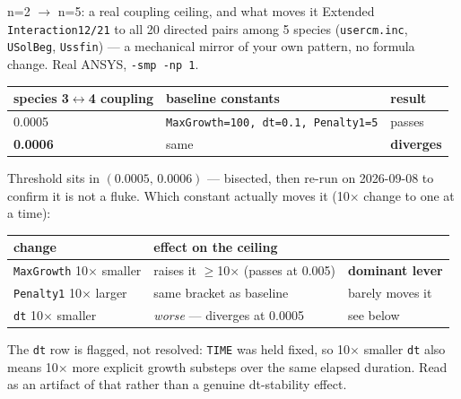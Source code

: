 \documentclass[aspectratio=169,11pt]{beamer}
\begin{document}
\begin{frame}{n=2 $\to$ n=5: a real coupling ceiling, and what moves it}
\small Extended \texttt{Interaction12/21} to all 20 directed pairs among 5
species (\texttt{usercm.inc}, \texttt{USolBeg}, \texttt{Ussfin}) --- a
mechanical mirror of your own pattern, no formula change. Real ANSYS,
\texttt{-smp -np 1}.
\vspace{3pt}
\begin{center}\footnotesize
\begin{tabular}{@{}lll@{}}
\toprule
species 3$\leftrightarrow$4 coupling & baseline constants & result \\
\midrule
0.0005 & \texttt{MaxGrowth=100, dt=0.1, Penalty1=5} & passes \\
\textbf{0.0006} & same & \textbf{diverges} \\
\bottomrule
\end{tabular}
\end{center}
\vspace{2pt}
{\footnotesize Threshold sits in $(0.0005,\,0.0006)$ --- bisected, then
re-run on 2026-09-08 to confirm it is not a fluke.}
\vspace{5pt}
\small Which constant actually moves it (10$\times$ change to one at a time):
\begin{center}\footnotesize
\begin{tabular}{@{}lll@{}}
\toprule
change & effect on the ceiling & \\
\midrule
\texttt{MaxGrowth} 10$\times$ smaller & raises it $\geq$10$\times$ (passes at 0.005) & \textbf{dominant lever} \\
\texttt{Penalty1} 10$\times$ larger & same bracket as baseline & barely moves it \\
\texttt{dt} 10$\times$ smaller & \emph{worse} --- diverges at 0.0005 & see below \\
\bottomrule
\end{tabular}
\end{center}
\vspace{2pt}
{\footnotesize The \texttt{dt} row is flagged, not resolved: \texttt{TIME} was
held fixed, so 10$\times$ smaller \texttt{dt} also means 10$\times$ more
explicit growth substeps over the same elapsed duration. Read as an artifact
of that rather than a genuine dt-stability effect.}
\end{frame}
\end{document}
